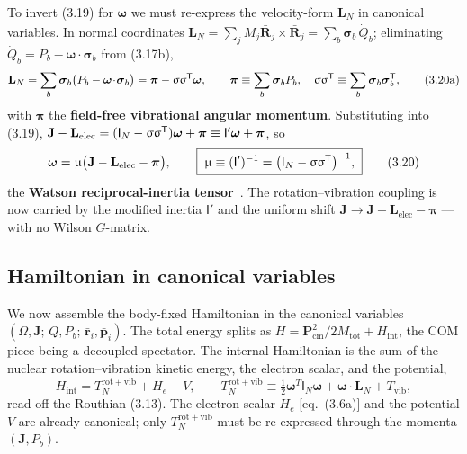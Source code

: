 To invert (3.19) for $\boldsymbol{\omega}$ we must re-express the velocity-form $\mathbf{L}_N$ in canonical variables. In normal coordinates $\mathbf{L}_N=\sum_jM_j\bar{\mathbf{R}}_j\!\times\!\dot{\bar{\mathbf{R}}}_j=\sum_b\boldsymbol{\sigma}_b\,\dot Q_b$; eliminating $\dot Q_b=P_b-\boldsymbol{\omega}\!\cdot\!\boldsymbol{\sigma}_b$ from (3.17b),
\begin{equation}
\mathbf{L}_N=\sum_b\boldsymbol{\sigma}_b\bigl(P_b-\boldsymbol{\omega}\!\cdot\!\boldsymbol{\sigma}_b\bigr)=\boldsymbol{\pi}-\upsigma\upsigma^{\mathsf T}\boldsymbol{\omega},\qquad
\boldsymbol{\pi}\equiv\sum_b\boldsymbol{\sigma}_bP_b,\quad \upsigma\upsigma^{\mathsf T}\equiv\sum_b\boldsymbol{\sigma}_b\boldsymbol{\sigma}_b^{\mathsf T}, \tag{3.20a}
\end{equation}
with $\boldsymbol{\pi}$ the \textbf{field-free vibrational angular momentum}. Substituting into (3.19), $\mathbf{J}-\mathbf{L}_{\mathrm{elec}}=(\mathsf{I}_N-\upsigma\upsigma^{\mathsf T})\boldsymbol{\omega}+\boldsymbol{\pi}\equiv\mathsf{I}'\boldsymbol{\omega}+\boldsymbol{\pi}$, so
\begin{equation}
\boldsymbol{\omega}=\upmu\bigl(\mathbf{J}-\mathbf{L}_{\mathrm{elec}}-\boldsymbol{\pi}\bigr),\qquad
\boxed{\;\upmu\equiv(\mathsf{I}')^{-1}=\bigl(\mathsf{I}_N-\upsigma\upsigma^{\mathsf T}\bigr)^{-1},\;} \tag{3.20}
\end{equation}
the \textbf{Watson reciprocal-inertia tensor}~\cite{watson1968}. The rotation--vibration coupling is now carried by the modified inertia $\mathsf{I}'$ and the uniform shift $\mathbf{J}\to\mathbf{J}-\mathbf{L}_{\mathrm{elec}}-\boldsymbol{\pi}$ --- with no Wilson $G$-matrix.

\subsection{Hamiltonian in canonical variables}

We now assemble the body-fixed Hamiltonian in the canonical variables $(\Omega,\mathbf{J};\,Q,P_b;\,\bar{\mathbf{r}}_i,\bar{\mathbf{p}}_i)$. The total energy splits as $H=\mathbf{P}_{\mathrm{cm}}^2/2M_{\mathrm{tot}}+H_{\mathrm{int}}$, the COM piece being a decoupled spectator. The internal Hamiltonian is the sum of the nuclear rotation--vibration kinetic energy, the electron scalar, and the potential,
\begin{equation*}
H_{\mathrm{int}}=T_N^{\mathrm{rot+vib}}+H_e+V,\qquad T_N^{\mathrm{rot+vib}}\equiv\tfrac12\boldsymbol{\omega}^{T}\mathsf{I}_N\boldsymbol{\omega}+\boldsymbol{\omega}\!\cdot\!\mathbf{L}_N+T_{\mathrm{vib}},
\end{equation*}
read off the Routhian (3.13). The electron scalar $H_e$ [eq.~(3.6a)] and the potential $V$ are already canonical; only $T_N^{\mathrm{rot+vib}}$ must be re-expressed through the momenta $(\mathbf{J},P_b)$.

